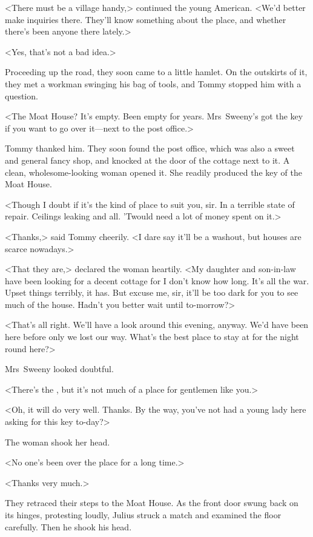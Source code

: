 <There must be a village handy,> continued the young American. <We'd better make inquiries there. They'll know something about the place, and whether there's been anyone there lately.>

<Yes, that's not a bad idea.>

Proceeding up the road, they soon came to a little hamlet. On the outskirts of it, they met a workman swinging his bag of tools, and Tommy stopped him with a question.

<The Moat House? It's empty. Been empty for years. Mrs~Sweeny's got the key if you want to go over it—next to the post office.>

Tommy thanked him. They soon found the post office, which was also a sweet and general fancy shop, and knocked at the door of the cottage next to it. A clean, wholesome-looking woman opened it. She readily produced the key of the Moat House.

<Though I doubt if it's the kind of place to suit you, sir. In a terrible state of repair. Ceilings leaking and all. 'Twould need a lot of money spent on it.>

<Thanks,> said Tommy cheerily. <I dare say it'll be a washout, but houses are scarce nowadays.>

<That they are,> declared the woman heartily. <My daughter and son-in-law have been looking for a decent cottage for I don't know how long. It's all the war. Upset things terribly, it has. But excuse me, sir, it'll be too dark for you to see much of the house. Hadn't you better wait until to-morrow?>

<That's all right. We'll have a look around this evening, anyway. We'd have been here before only we lost our way. What's the best place to stay at for the night round here?>

Mrs~Sweeny looked doubtful.

<There's the , but it's not much of a place for gentlemen like you.>

<Oh, it will do very well. Thanks. By the way, you've not had a young lady here asking for this key to-day?>

The woman shook her head.

<No one's been over the place for a long time.>

<Thanks very much.>

They retraced their steps to the Moat House. As the front door swung back on its hinges, protesting loudly, Julius struck a match and examined the floor carefully. Then he shook his head.

